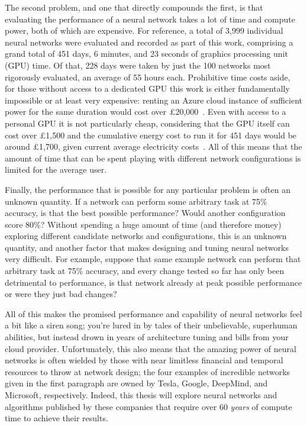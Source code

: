 The second problem, and one that directly compounds the first, is that evaluating the performance of a neural network
takes a lot of time and compute power, both of which are expensive. For reference, a total of 3,999 individual neural
networks were evaluated and recorded as part of this work, comprising a grand total of 451 days, 6 minutes, and 23 seconds of graphics
processing unit (GPU)
time. Of that, 228 days were taken by just the 100 networks most rigorously evaluated, an average of 55 hours each. Prohibitive
time costs aside, for those without access to a dedicated GPU this work is either fundamentally
impossible or at least very expensive: renting an Azure cloud instance of sufficient power
for the same duration would cost over \pounds20,000~\citep{AzurePricing}. Even with access to a personal GPU it is not particularly cheap,
considering that the GPU itself can cost over £1,500 and the cumulative energy cost to run it for 451 days would be
around £1,700, given current average electricity costs~\citep{UKEnergyPrice}. All of this means that the amount of time that
can be spent playing with different network configurations is limited for the average user.

Finally, the performance that is possible for any particular problem is often an unknown quantity. If a network
can perform some arbitrary task at 75\% accuracy, is that the best possible performance? Would another configuration score 80\%?
Without spending a huge amount of time (and therefore money) exploring different candidate networks and configurations,
this is an unknown quantity, and another factor that makes designing and tuning neural networks very difficult.
For example, suppose that same example network can perform that arbitrary task at 75\% accuracy, and every change tested so
far has only been detrimental to performance, is that network already at peak possible performance or were they just
bad changes?

All of this makes the promised performance and capability of neural networks feel a bit like a siren song; you're lured
in by tales of their unbelievable, superhuman abilities, but instead drown in years of architecture tuning and
bills from your cloud provider. Unfortunately, this also means that the amazing power of neural networks is often
wielded by those with near limitless financial and temporal resources to throw at network design; the four
examples of incredible networks given in the first paragraph are owned by Tesla, Google, DeepMind, and Microsoft, respectively.
Indeed, this thesis will explore neural networks and algorithms published by these companies that require
over 60 \textit{years} of compute time to achieve their results.

